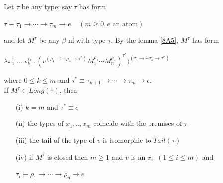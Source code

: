 \documentclass[a4paper,10pt]{article}
\begin{document}
\begin{com}
 Let $\tau$ be any type; say $\tau$ has form
\begin{center}
 $\tau \equiv \tau_1 \rightarrow \cdots \rightarrow \tau_m \rightarrow e \,\,\,\,\,\,\, (m \geq 0, e \mbox{ an atom})$
\end{center}
and let $M^{\tau}$ be any $\beta$-nf with type $\tau$. By the lemma \ref{8A5}, $M^{\tau}$ has form
\begin{center}
 $\lambda x_1^{\tau_1} ... \,x_k^{\tau_k} \, . \,
   (v^{(\rho_1 \rightarrow \cdots \rho_n \rightarrow \tau^*)} M^{\rho_1}_1 \cdots
   M^{\rho_n}_n)^{\tau^*})^{(\tau_1 \rightarrow \cdots \tau_k \rightarrow \tau^*)}$
\end{center}
where $0 \leq k \leq m$ and $\tau^* \equiv \tau_{k+1} \to \cdots \to \tau_m \to e$.\\[0.3 cm]
If $M^{\tau} \in Long(\tau)$, then
\begin{itemize}
 \item[(i)] $k = m$ and $\tau^* \equiv e$
 \item[(ii)] the types of $x_1,..,x_m$ coincide with the premises of $\tau$
 \item[(iii)] the tail of the type of $v$ is isomorphic to $Tail(\tau)$
 \item[(iv)] if $M^{\tau}$ is closed then $m \geq 1$ and $v$ is an $x_i \,\,\, (1 \leq i \leq m)$ and
 \begin{center}
  $\tau_i \equiv \rho_1 \to \cdots \to \rho_n \to e$
 \end{center}
\end{itemize}
\end{com}
\end{document}
